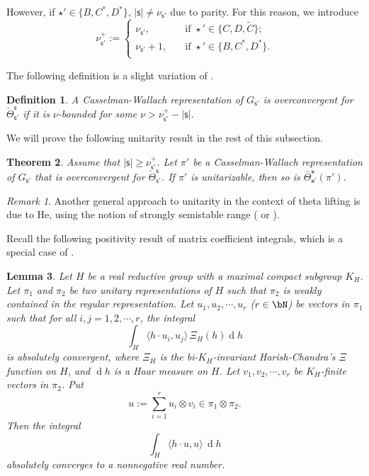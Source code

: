 \documentclass[11pt,a4paper]{amsart}
\def\abs#1{\left|{#1}\right|}
\newcommand{\od}{\operatorname{d}}
\newcommand{\la}{\langle}
\newcommand{\ra}{\rangle}
\numberwithin{equation}{section}
\newtheorem{thm}{Theorem}[section]
\newtheorem{lem}[thm]{Lemma}
\newtheorem{defn}[thm]{Definition}
\theoremstyle{remark}
\newtheorem*{remark}{Remark}
\def\Thetab{\bar{\Theta}}
\begin{document}
However, if $\star'\in\{B, C^*, D^*\}$, $\abs{\mathsf s}\neq\nu_{\mathsf s'}$ due to  parity. For this reason, we introduce
\begin{equation}\label{nuplus}
   \nu_{\mathsf s'}^+:=\begin{cases}
    \nu_{\mathsf s'},\quad &\textrm{if }\star'\in \{C, D, \widetilde C\};\\
     \nu_{\mathsf s'}+1,\quad &\textrm{if }\star'\in \{B, C^*, D^*\}.\\
  \end{cases}
\end{equation}

The following definition is a slight variation of .
 \begin{defn}\label{defn:CR33}
A Casselman-Wallach representation  of $G_{\mathsf s'}$ is overconvergent  for $\check \Theta_{\mathsf s'}^{\mathsf s}$ if
 it is  $\nu$-bounded  for some $\nu>\nu_{\mathsf s'}^+ -\abs{\mathsf s}$.
\end{defn}

We will prove the  following unitarity result in the rest of this subsection.
\begin{thm}\label{positivity000}
Assume that $\abs{\mathsf s}\geq \nu_{\mathsf s'}^+$. Let $\pi'$ be a Casselman-Wallach representation of $G_{\mathsf s'}$ that is overconvergent  for $\check \Theta_{\mathsf s'}^{\mathsf s}$. If $\pi'$ is unitarizable, then so is $\Thetab_{\mathbf s'}^{\mathbf s}(\pi')$.
\end{thm}

\begin{remark} Another general approach to unitarity in the context of theta lifting is due to He, using the notion of strongly semistable range (\cite[Chapter 5]{He} or \cite{He2}).
\end{remark}


Recall the following positivity result of matrix coefficient integrals, which is a special case of \cite[Theorem A. 5]{HLS}.

\begin{lem}\label{positivity}
Let $H$ be a real reductive group with a maximal compact subgroup $K_H$. Let $\pi_1$ and $\pi_2$ be two unitary representations of $H$ such that $\pi_2$ is weakly
contained in the regular representation. Let $u_1, u_2, \cdots, u_r$ ($r\in \bN$) be vectors in $\pi_1$ such that for all $i,j=1,2, \cdots, r$,
the integral
\[
  \int_H \la h\cdot u_i, u_j\ra\,\Xi_H (h) \od\!h %
\]
is absolutely convergent, where  $\Xi_H$ is the bi-$K_H$-invariant Harish-Chandra's $\Xi$ function on $H$, and $\od\!h$ is a Haar measure on $H$.   Let $v_1,v_2,\cdots, v_r$ be  $K_H$-finite vectors in $\pi_2$.
Put
\[
u:=\sum_{i=1}^r u_i\otimes v_i\in \pi_1\otimes \pi_2.
\]
Then the integral
\[
\int_H \la h \cdot u,u \rangle\,\od\! h
\]
absolutely converges to a nonnegative real number.
\end{lem}
\end{document}
